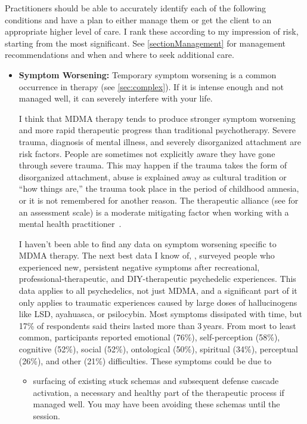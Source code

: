 \documentclass[11pt,oneside]{book}
\let\cite\parencite
\begin{document}
Practitioners should be able to accurately identify each of the following conditions and have a plan to either manage them or get the client to an appropriate higher level of care. I rank these according to my impression of risk, starting from the most significant. See \cref{sectionManagement} for management recommendations and when and where to seek additional care.
\begin{itemize}
    \item \textbf{Symptom Worsening:} Temporary symptom worsening is a common occurrence in therapy (see \cref{sec:complex}). If it is intense enough and not managed well, it can severely interfere with your life.

    I think that MDMA therapy tends to produce stronger symptom worsening and more rapid therapeutic progress than traditional psychotherapy. Severe trauma, diagnosis of mental illness, and severely disorganized attachment are risk factors. People are sometimes not explicitly aware they have gone through severe trauma. This may happen if the trauma takes the form of disorganized attachment, abuse is explained away as cultural tradition or \enquote{how things are,} the trauma took place in the period of childhood amnesia, or it is not remembered for another reason. The therapeutic alliance (see \textcite{BRWAIdownload} for an assessment scale) is a moderate mitigating factor when working with a mental health practitioner~\cite{fluckiger2018alliance}.

    I haven't been able to find any data on symptom worsening specific to MDMA therapy. The next best data I know of, \textcite{evans2023extended}, surveyed people who experienced new, persistent negative symptoms after recreational, professional-therapeutic, and DIY-therapeutic psychedelic experiences. This data applies to all psychedelics, not just MDMA, and a significant part of it only applies to traumatic experiences caused by large doses of hallucinogens like LSD, ayahuasca, or psilocybin. Most symptoms dissipated with time, but 17\% of respondents said theirs lasted more than 3\,years. From most to least common, participants reported emotional (76\%), self-perception (58\%), cognitive (52\%), social (52\%), ontological (50\%), spiritual (34\%), perceptual (26\%), and other (21\%) difficulties. These symptoms could be due to~\cite{calder2025traumatic}
    \begin{itemize}
        \item surfacing of existing stuck schemas and subsequent defense cascade activation, a necessary and healthy part of the therapeutic process if managed well. You may have been avoiding these schemas until the session.
        

\end{itemize}
\end{itemize}
\end{document}
